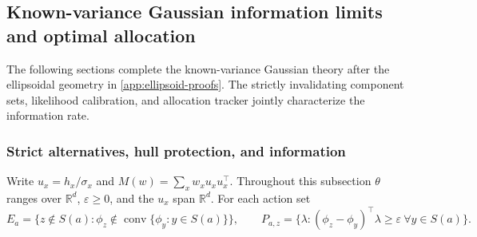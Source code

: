 \documentclass{article}
\theoremstyle{plain}
\theoremstyle{definition}
\begin{document}
\subsection{Known-variance Gaussian information limits and optimal allocation}
\label{app:known-gauss-info}
The following sections complete the known-variance Gaussian theory after the ellipsoidal geometry in \cref{app:ellipsoid-proofs}. The strictly invalidating component sets, likelihood calibration, and allocation tracker jointly characterize the information rate.


\subsubsection{Strict alternatives, hull protection, and information}

Write $u_x=h_x/\sigma_x$ and
$M(w)=\sum_xw_xu_xu_x^\top$.  Throughout this subsection $\theta$ ranges
over $\mathbb R^d$, $\varepsilon\ge0$, and the $u_x$ span $\mathbb R^d$.
For each action set
\[
 E_a=\{z\notin S(a):\phi_z\notin
                \operatorname{conv}\{\phi_y:y\in S(a)\}\},\qquad
 P_{a,z}=\{\lambda:(\phi_z-\phi_y)^\top\lambda\ge\varepsilon
                                  \ \forall y\in S(a)\}.
\]
\end{document}
